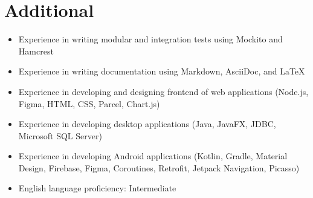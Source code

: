 \documentclass[letterpaper,11pt]{report}
\newcommand{\bulletItem}[1]{\item[$\bullet$] #1}
\begin{document}
\section{Additional}
\begin{itemize}
\bulletItem{Experience in writing modular and integration tests using Mockito and Hamcrest}
\bulletItem{Experience in writing documentation using Markdown, AsciiDoc, and LaTeX}
\bulletItem{Experience in developing and designing frontend of web applications (Node.js, Figma, HTML, CSS, Parcel, Chart.js)}
\bulletItem{Experience in developing desktop applications (Java, JavaFX, JDBC, Microsoft SQL Server)}
\bulletItem{Experience in developing Android applications (Kotlin, Gradle, Material Design, Firebase, Figma, Coroutines, Retrofit, Jetpack Navigation, Picasso)}
\bulletItem{English language proficiency: Intermediate}
\end{itemize}
\end{document}
